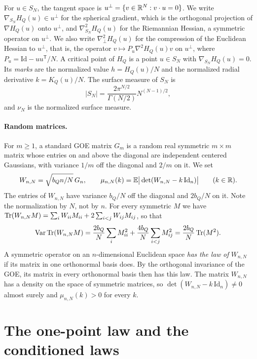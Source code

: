 For $u\in S_N$, the tangent space is $u^\perp=\{v\in\mathbb R^N:v\cdot u=0\}$. We write $\nabla_{S_N}H_Q(u)\in u^\perp$ for the spherical gradient, which is the orthogonal projection of $\nabla H_Q(u)$ onto $u^\perp$, and $\nabla^2_{S_N}H_Q(u)$ for the Riemannian Hessian, a symmetric operator on $u^\perp$. We also write $\nabla^2_\perp H_Q(u)$ for the compression of the Euclidean Hessian to $u^\perp$, that is, the operator $v\mapsto P_u\nabla^2H_Q(u)v$ on $u^\perp$, where $P_u=\mathrm{Id}-uu^{\mathsf T}/N$. A critical point of $H_Q$ is a point $u\in S_N$ with $\nabla_{S_N}H_Q(u)=0$. Its \emph{marks} are the normalized value $h=H_Q(u)/N$ and the normalized radial derivative $k=K_Q(u)/N$. The surface measure of $S_N$ is
\[
|S_N|=\frac{2\pi^{N/2}}{\Gamma(N/2)}N^{(N-1)/2},
\]
and $\nu_N$ is the normalized surface measure.

\paragraph{Random matrices.}
For $m\ge1$, a standard GOE matrix $G_m$ is a random real symmetric $m\times m$ matrix whose entries on and above the diagonal are independent centered Gaussians, with variance $1/m$ off the diagonal and $2/m$ on it. We set
\[
W_{n,N}=\sqrt{b_Qn/N}\,G_n,\qquad \mu_{n,N}(k)=\mathbb E\big|\det(W_{n,N}-k\,\mathrm{Id}_n)\big|\qquad(k\in\mathbb R).
\]
The entries of $W_{n,N}$ have variance $b_Q/N$ off the diagonal and $2b_Q/N$ on it. Note the normalization by $N$, not by $n$. For every symmetric $M$ we have $\operatorname{Tr}(W_{n,N}M)=\sum_iW_{ii}M_{ii}+2\sum_{i<j}W_{ij}M_{ij}$, so that
\begin{equation}\label{eq:kr-goe-covariance}
\operatorname{Var}\operatorname{Tr}(W_{n,N}M)=\frac{2b_Q}N\sum_iM_{ii}^2+\frac{4b_Q}N\sum_{i<j}M_{ij}^2=\frac{2b_Q}N\operatorname{Tr}(M^2).
\end{equation}
A symmetric operator on an $n$-dimensional Euclidean space \emph{has the law of} $W_{n,N}$ if its matrix in one orthonormal basis does. By the orthogonal invariance of the GOE, its matrix in every orthonormal basis then has this law. The matrix $W_{n,N}$ has a density on the space of symmetric matrices, so $\det(W_{n,N}-k\,\mathrm{Id}_n)\neq0$ almost surely and $\mu_{n,N}(k)>0$ for every $k$.

\section{The one-point law and the conditioned laws}\label{sec:kr-one-point}

